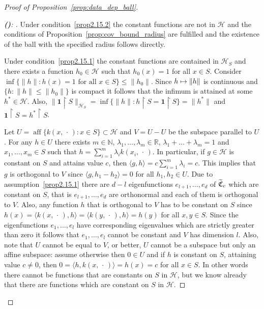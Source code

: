 \documentclass[10pt]{amsart}
\theoremstyle{definition}\newtheorem{defi}[theo]{Definition}\newtheorem{rema}[theo]{Remark}\newtheorem{exam}[theo]{Example}\newtheorem{exem}[theo]{Example}\newtheorem{nota}[theo]{Notation}
\theoremstyle{remark}
\DeclareMathOperator{\aff}{aff}
\newcommand{\restrr}
{\!\!\upharpoonright\!\!}
\newcommand{\R}{\mathbb{R}}
\newcommand{\bbN}{\mathbb{N}}
\newcommand{\cH}{\mathcal{H}}
\newcommand{\fkC}{\mathfrak{C}}
\let\oldtilde\tilde
\renewcommand*{\tilde}[1]{\mathchoice{\widetilde{#1}}{\widetilde{#1}}{\oldtilde{#1}}{\oldtilde{#1}}}
\let\oldmapsto\mapsto
\renewcommand*{\mapsto}{\mathchoice{\longmapsto}{\oldmapsto}{\oldmapsto}{\oldmapsto}}
\newcounter{setofstep}
\newcounter{step}[setofstep]
\newenvironment{step}[1][]{\refstepcounter{step}\begin{proof}[{\textbf{(\thestep)}\if#1\empty\else: #1\fi}]}{\let\qed\relax\end{proof}}
\renewcommand{\thestep}{\alph{step}}
\newenvironment{proofc}[1][\proofname]{\begin{proof}[{#1}]}{\end{proof}}\AtBeginDocument{\special{pdf:mapfile +yhmath.map}}
\begin{document}
\begin{proofc}[{Proof of Proposition~\ref{prop:data_dep_ball}}]
\begin{step}\label{prfprop2.15stp5}
Under condition~\eqref{prop2.15.2} the constant functions are not in $\cH$ and the conditions of Proposition~\ref{prop:cov_bound_radius} are fulfilled and the existence of the ball with the specified radius follows directly.



Under condition~\eqref{prop2.15.1} the constant functions are contained in $\cH_S$ and there exists a function $h_0 \in \cH$ such that $h_0(x)= 1$ for all $x \in S$. Consider $\inf \{\|h \| : h(x) =1 \text{ for all } x \in S \} \leq \|h_0\|$. Since $h \mapsto \|h\|$ is continuous and $\{ h : \|h \| \leq \|h_0\|\}$ is compact it follows that the infimum is attained at some $h^* \in \cH$. Also, $\|\bm 1\restrr S\|_{\cH_S} = \inf \{\|h\| : h\restrr S = \bm 1\restrr S \} = \|h^*\|$ and $\bm 1\restrr S = h^*\restrr S$.

Let $U= \aff \{ k(x,\,\cdot\,) : x\in S\} \subset \cH$ and $V = U-U$ be the subspace parallel to $U$. For any $h \in U$ there exists $m \in \bbN$, $\lambda_1,\dots, \lambda_m \in \R$, $\lambda_1 + \dots + \lambda_m = 1$ and $x_1,\dots, x_m \in S$ such that $h = \sum_{i=1}^m \lambda_i k(x_i,\,\cdot\,)$. In particular, if $g \in \cH$ is constant on $S$ and attains value $c$, then $\langle g,h \rangle = c \sum_{i=1}^m \lambda_i = c$. This implies that $g$ is orthogonal to $V$ since $\langle g, h_1 - h_2 \rangle = 0 $ for all $h_1,h_2 \in U$. Due to assumption~\eqref{prop2.15.1} there are $d-l$ eigenfunctions $e_{l+1},\dots, e_d$ of $\tilde{\fkC}_c$ which are constant on $S$, that is $e_{l+1},\dots, e_d$ are orthonormal and each of them is orthogonal to $V$. Also, any function $h$ that is orthogonal to $V$ has to be constant on $S$ since $h(x) = \langle k(x,\,\cdot\,), h \rangle = \langle k(y,\,\cdot\,), h \rangle =h(y)$ for all $x,y \in S$. Since the eigenfunctions $e_1, \dots, e_l$ have corresponding eigenvalues which are strictly greater than zero it follows that $e_1,\dots, e_l$ cannot be constant and $V$ has dimension $l$. Also, note that $U$ cannot be equal to $V$, or better, $U$ cannot be a subspace but only an affine subspace: assume otherwise then $0 \in U$ and if $h$ is constant on $S$, attaining value $c \not = 0$, then $0 = \langle h, k(x,\,\cdot\,) \rangle = h(x) = c $ for all $x \in S$. In other words there cannot be functions that are constants on $S$ in $\cH$, but we know already that there are functions which are constant on $S$ in $\cH$.
\end{step}


\end{proofc}
\end{document}
